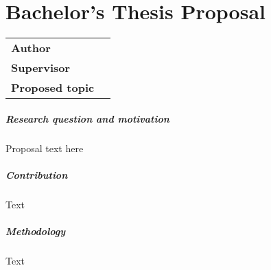 \chapter*{Bachelor's Thesis Proposal}

\begin{tabular}{lp{10.1cm}}
		\hline
		\textbf{Author} &\href{mailto:\Email}{\AutorDP}\\
		\textbf{Supervisor} &\href{mailto:\EmailSup}{\Supervisor}\\
		\textbf{Proposed topic} &\Bookname\\
		\hline
\end{tabular}

\bigskip

\small
\paragraph{Research question and motivation}

Proposal text here


\paragraph{Contribution}

Text

\paragraph{Methodology}

Text

